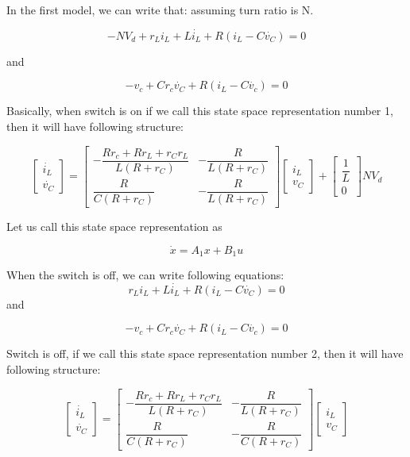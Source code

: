 In the first model, we can write that: assuming turn ratio is N.

\begin{equation}
    -NV_d + r_L i_L + L \Dot{i_L} + R(i_L - C\Dot{v_C}) = 0
\end{equation}

and 

\begin{equation}
    -v_c + C r_c \Dot{v_C} + R(i_L - C\Dot{v_c}) = 0
\end{equation}

Basically, when switch is on if we call this state space representation number 1, then it will have following structure:

\begin{equation}
\begin{bmatrix}
\Dot{i_L} \\ \Dot{v_C}
\end{bmatrix}
=
\begin{bmatrix}
 -\dfrac{Rr_c + Rr_L + r_C r_L}{L(R + r_C)} & -\dfrac{R}{L(R + r_C)} \\
 \dfrac{R}{C(R + r_C)} & -\dfrac{R}{L(R + r_C)} 
\end{bmatrix}
\begin{bmatrix}
i_L \\ v_C
\end{bmatrix}
+
\begin{bmatrix}
\dfrac{1}{L} \\ 0
\end{bmatrix}
NV_d
\end{equation}

Let us call this state space representation as

$$ \Dot{x} = A_1 x + B_1 u$$

When the switch is off, we can write following equations:
\begin{equation}
  r_L i_L + L \Dot{i_L} + R(i_L - C\Dot{v_C}) = 0  
\end{equation}
and

\begin{equation}
    -v_c + C r_c \Dot{v_C} + R(i_L - C\Dot{v_c}) = 0
\end{equation}

Switch is off, if we call this state space representation number 2, then it will have following structure:

\begin{equation}
\begin{bmatrix}
\Dot{i_L} \\ \Dot{v_C}
\end{bmatrix}
=
\begin{bmatrix}
 -\dfrac{Rr_c + Rr_L + r_C r_L}{L(R + r_C)} & -\dfrac{R}{L(R + r_C)} \\
 \dfrac{R}{C(R + r_C)} & -\dfrac{R}{C(R + r_C)} 
\end{bmatrix}
\begin{bmatrix}
i_L \\ v_C
\end{bmatrix}
\end{equation}

